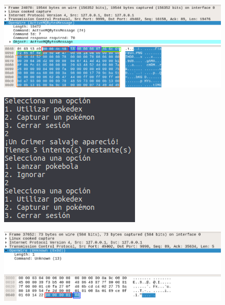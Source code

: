 \documentclass[12pt]{article}
\begin{document}
\begin{figure}[H]
  \centering
  \includegraphics[width=\textwidth]{22}
  \caption{}
\end{figure}

\begin{figure}[H]
  \centering
  \includegraphics[width=\textwidth]{23}
  \caption{}
\end{figure}

\begin{figure}[H]
  \centering
  \includegraphics[width=\textwidth]{24}
  \caption{}
\end{figure}
\end{document}
